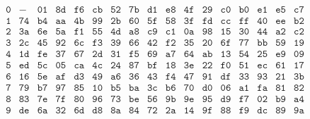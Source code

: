\begin{ejs}
\begin{table}[H]
\[\begin{array}{c|*{16}{c}}
\texttt{0} & - & \texttt{01} & \texttt{8d} & \texttt{f6} & \texttt{cb} & \texttt{52} & \texttt{7b} & \texttt{d1} & \texttt{e8} & \texttt{4f} & \texttt{29} & \texttt{c0} & \texttt{b0} & \texttt{e1} & \texttt{e5} & \texttt{c7} \\
\texttt{1} & \texttt{74} & \texttt{b4} & \texttt{aa} & \texttt{4b} & \texttt{99} & \texttt{2b} & \texttt{60} & \texttt{5f} & \texttt{58} & \texttt{3f} & \texttt{fd} & \texttt{cc} & \texttt{ff} & \texttt{40} & \texttt{ee} & \texttt{b2} \\
\texttt{2} & \texttt{3a} & \texttt{6e} & \texttt{5a} & \texttt{f1} & \texttt{55} & \texttt{4d} & \texttt{a8} & \texttt{c9} & \texttt{c1} & \texttt{0a} & \texttt{98} & \texttt{15} & \texttt{30} & \texttt{44} & \texttt{a2} & \texttt{c2} \\
\texttt{3} & \texttt{2c} & \texttt{45} & \texttt{92} & \texttt{6c} & \texttt{f3} & \texttt{39} & \texttt{66} & \texttt{42} & \texttt{f2} & \texttt{35} & \texttt{20} & \texttt{6f} & \texttt{77} & \texttt{bb} & \texttt{59} & \texttt{19} \\
\texttt{4} & \texttt{1d} & \texttt{fe} & \texttt{37} & \texttt{67} & \texttt{2d} & \texttt{31} & \texttt{f5} & \texttt{69} & \texttt{a7} & \texttt{64} & \texttt{ab} & \texttt{13} & \texttt{54} & \texttt{25} & \texttt{e9} & \texttt{09} \\
\texttt{5} & \texttt{ed} & \texttt{5c} & \texttt{05} & \texttt{ca} & \texttt{4c} & \texttt{24} & \texttt{87} & \texttt{bf} & \texttt{18} & \texttt{3e} & \texttt{22} & \texttt{f0} & \texttt{51} & \texttt{ec} & \texttt{61} & \texttt{17} \\
\texttt{6} & \texttt{16} & \texttt{5e} & \texttt{af} & \texttt{d3} & \texttt{49} & \texttt{a6} & \texttt{36} & \texttt{43} & \texttt{f4} & \texttt{47} & \texttt{91} & \texttt{df} & \texttt{33} & \texttt{93} & \texttt{21} & \texttt{3b} \\
\texttt{7} & \texttt{79} & \texttt{b7} & \texttt{97} & \texttt{85} & \texttt{10} & \texttt{b5} & \texttt{ba} & \texttt{3c} & \texttt{b6} & \texttt{70} & \texttt{d0} & \texttt{06} & \texttt{a1} & \texttt{fa} & \texttt{81} & \texttt{82} \\
\texttt{8} & \texttt{83} & \texttt{7e} & \texttt{7f} & \texttt{80} & \texttt{96} & \texttt{73} & \texttt{be} & \texttt{56} & \texttt{9b} & \texttt{9e} & \texttt{95} & \texttt{d9} & \texttt{f7} & \texttt{02} & \texttt{b9} & \texttt{a4} \\
\texttt{9} & \texttt{de} & \texttt{6a} & \texttt{32} & \texttt{6d} & \texttt{d8} & \texttt{8a} & \texttt{84} & \texttt{72} & \texttt{2a} & \texttt{14} & \texttt{9f} & \texttt{88} & \texttt{f9} & \texttt{dc} & \texttt{89} & \texttt{9a} \\

\end{array}\]
\end{table}
\end{ejs}
